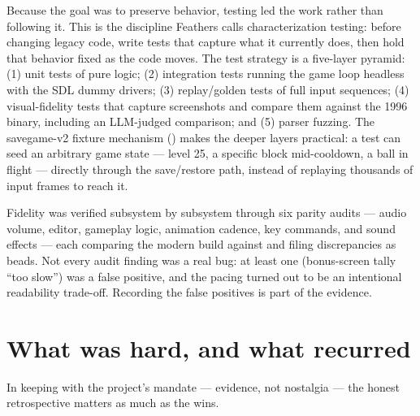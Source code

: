 \documentclass[11pt,a4paper]{article}
\begin{document}
Because the goal was to preserve behavior, testing led the work rather than
following it. This is the discipline Feathers \citep{feathers2004} calls
characterization testing: before changing legacy code, write tests that
capture what it currently does, then hold that behavior fixed as the code
moves. The test strategy is a five-layer pyramid: (1)  unit
tests of pure logic; (2) integration tests running the game loop headless
with the SDL dummy drivers; (3) replay/golden tests of full input sequences;
(4) visual-fidelity tests that capture screenshots and compare them against
the 1996 binary, including an LLM-judged comparison; and (5) parser fuzzing.
The savegame-v2 fixture mechanism () makes the deeper layers
practical: a test can seed an arbitrary game state --- level 25, a specific
block mid-cooldown, a ball in flight --- directly through the save/restore
path, instead of replaying thousands of input frames to reach it.

Fidelity was verified subsystem by subsystem through six parity audits ---
audio volume, editor, gameplay logic, animation cadence, key commands, and
sound effects --- each comparing the modern build against
 and filing discrepancies as beads. Not every audit
finding was a real bug: at least one (bonus-screen tally ``too slow'') was
a false positive, and the pacing turned out to be an intentional
readability trade-off. Recording the false positives is part of the
evidence.

\section{What was hard, and what recurred}

In keeping with the project's mandate --- evidence, not nostalgia --- the
honest retrospective matters as much as the wins.
\end{document}
